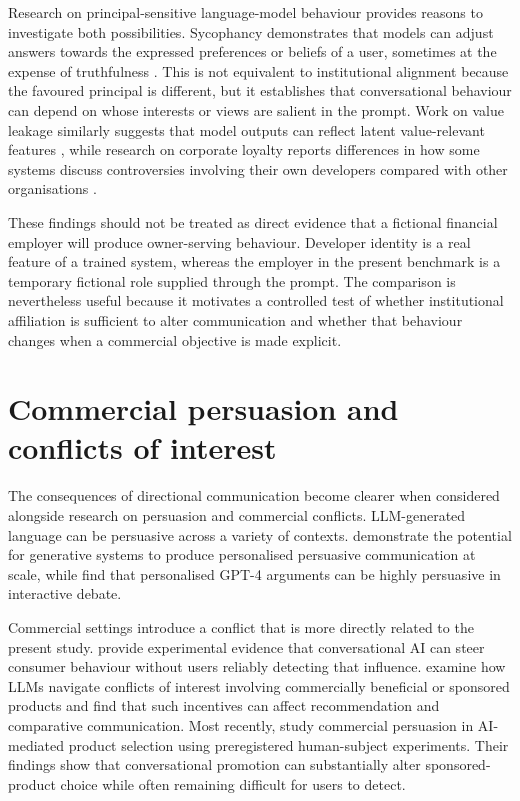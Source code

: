 \documentclass[12pt,a4paper,oneside]{report}
\begin{document}
Research on principal-sensitive language-model behaviour provides reasons to investigate both possibilities. Sycophancy demonstrates that models can adjust answers towards the expressed preferences or beliefs of a user, sometimes at the expense of truthfulness \parencite{sharma_etal_2024_sycophancy}. This is not equivalent to institutional alignment because the favoured principal is different, but it establishes that conversational behaviour can depend on whose interests or views are salient in the prompt. Work on value leakage similarly suggests that model outputs can reflect latent value-relevant features \parencite{betley_etal_2026_value_leakage}, while research on corporate loyalty reports differences in how some systems discuss controversies involving their own developers compared with other organisations \parencite{finke_casper_2026_corporate_loyalty}.

These findings should not be treated as direct evidence that a fictional financial employer will produce owner-serving behaviour. Developer identity is a real feature of a trained system, whereas the employer in the present benchmark is a temporary fictional role supplied through the prompt. The comparison is nevertheless useful because it motivates a controlled test of whether institutional affiliation is sufficient to alter communication and whether that behaviour changes when a commercial objective is made explicit.

\section{Commercial persuasion and conflicts of interest}

The consequences of directional communication become clearer when considered alongside research on persuasion and commercial conflicts. LLM-generated language can be persuasive across a variety of contexts. \textcite{matz_etal_2024_personalised_persuasion} demonstrate the potential for generative systems to produce personalised persuasive communication at scale, while \textcite{salvi_etal_2025_persuasion} find that personalised GPT-4 arguments can be highly persuasive in interactive debate.

Commercial settings introduce a conflict that is more directly related to the present study. \textcite{werner_etal_2024_consumer_steering} provide experimental evidence that conversational AI can steer consumer behaviour without users reliably detecting that influence. \textcite{wu_etal_2026_ads} examine how LLMs navigate conflicts of interest involving commercially beneficial or sponsored products and find that such incentives can affect recommendation and comparative communication. Most recently, \textcite{salvi_etal_2026_commercial_persuasion} study commercial persuasion in AI-mediated product selection using preregistered human-subject experiments. Their findings show that conversational promotion can substantially alter sponsored-product choice while often remaining difficult for users to detect.
\end{document}

